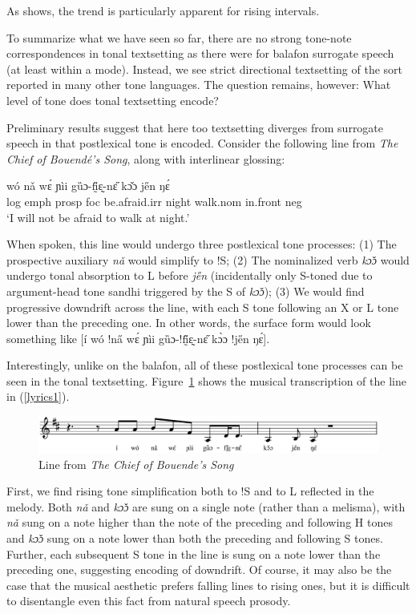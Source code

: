 \documentclass[output=paper]{langscibook}
\begin{document}
As  shows, the trend is particularly apparent for rising intervals. 

To summarize what we have seen so far, there are no strong tone-note correspondences in tonal textsetting as there were for balafon surrogate speech (at least within a mode). Instead, we see strict directional textsetting of the sort reported in many other tone languages. The question remains, however: What level of tone does tonal textsetting encode? 

Preliminary results suggest that here too textsetting diverges from surrogate speech in that postlexical tone is encoded. Consider the following line from \textit{The Chief of Bouendé's Song}, along with interlinear glossing:

\ea\label{lyrics1} 
 {wó} {nǎ} {wɛ́} {ɲìi} {gȕɔ-fḭ̋ɛ̰-nɛ̋} {kɔ̌ɔ} {je̋n} {ŋɛ́} \\
{\sc log} {\sc emph} {\sc prosp} {\sc foc} be.afraid.{\sc irr} night walk.{\sc nom} in.front {\sc neg} \\
\glt `I will not be afraid to walk at night.'
\z 

When spoken, this line would undergo three postlexical tone processes: (1) The prospective auxiliary \textit{nǎ} would simplify to !S; (2) The nominalized verb \textit{kɔ̌ɔ} would undergo tonal absorption to L before \textit{je̋n} (incidentally only S-toned due to argument-head tone sandhi triggered by the S of \textit{kɔ̌ɔ}); (3)  We would find progressive downdrift across the line, with each S tone following an X or L tone lower than the preceding one. In other words, the surface form would look something like [í wó !na̋ wɛ́ ɲìi gȕɔ-!fḭ̋ɛ̰-nɛ̋ kɔ̀ɔ !je̋n ŋɛ́]. 

Interestingly, unlike on the balafon, all of these postlexical tone processes can be seen in the tonal textsetting. Figure~\ref{fig:songline:bouendechief} shows the musical transcription of the line in (\ref{lyrics1}). 

 \begin{figure}
  \includegraphics[width=\textwidth]{figures/scared-line.eps}
  \caption{Line from \textit{The Chief of Bouende's Song}\label{fig:songline:bouendechief}}
\end{figure}

First, we find rising tone simplification both to !S and to L reflected in the melody. Both \textit{nǎ} and \textit{kɔ̌ɔ} are sung on a single note (rather than a melisma), with \textit{nǎ} sung on a note higher than the note of the preceding and following H tones and \textit{kɔ̌ɔ} sung on a note lower than both the preceding and following S tones. Further, each subsequent S tone in the line is sung on a note lower than the preceding one, suggesting encoding of downdrift. Of course, it may also be the case that the musical aesthetic prefers falling lines to rising ones, but it is difficult to disentangle even this fact from natural speech prosody. 
\end{document}

